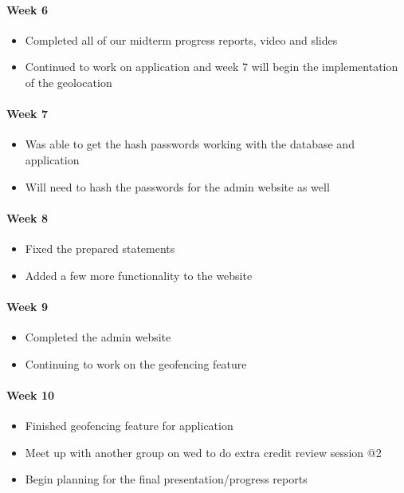 \documentclass[onecolumn, draftclsnofoot,10pt, compsoc]{IEEEtran}
\begin{document}
      \paragraph{Week 6}
        \begin{itemize}
          \item Completed all of our midterm progress reports, video and slides
          \item Continued to work on application and week 7 will begin the implementation of the geolocation
        \end{itemize}

      \paragraph{Week 7}
        \begin{itemize}
          \item Was able to get the hash passwords working with the database and application
          \item Will need to hash the passwords for the admin website as well
        \end{itemize}

      \paragraph{Week 8}
        \begin{itemize}
          \item Fixed the prepared statements
          \item Added a few more functionality to the website
        \end{itemize}

      \paragraph{Week 9}
        \begin{itemize}
          \item Completed the admin website
          \item Continuing to work on the geofencing feature
        \end{itemize}

      \paragraph{Week 10}
        \begin{itemize}
          \item Finished geofencing feature for application
          \item Meet up with another group on wed to do extra credit review session @2
          \item Begin planning for the final presentation/progress reports
        \end{itemize}
\end{document}
